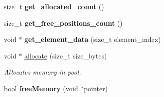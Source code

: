 \begin{DoxyCompactItemize}
\item 
\hypertarget{classbt_generic_memory_pool_a6e483e9117e17c8df23ba42a12283ea6}{size\+\_\+t {\bfseries get\+\_\+allocated\+\_\+count} ()}\label{classbt_generic_memory_pool_a6e483e9117e17c8df23ba42a12283ea6}

\item 
\hypertarget{classbt_generic_memory_pool_a969d29bf5f9b52a8d9d34ed9f529e3f9}{size\+\_\+t {\bfseries get\+\_\+free\+\_\+positions\+\_\+count} ()}\label{classbt_generic_memory_pool_a969d29bf5f9b52a8d9d34ed9f529e3f9}

\item 
\hypertarget{classbt_generic_memory_pool_aab43c7fd24932f6a1e8b593672df6008}{void $\ast$ {\bfseries get\+\_\+element\+\_\+data} (size\+\_\+t element\+\_\+index)}\label{classbt_generic_memory_pool_aab43c7fd24932f6a1e8b593672df6008}

\item 
void $\ast$ \hyperlink{classbt_generic_memory_pool_acd47d75d6fbd7dbf6f0d7849e0bd9ec1}{allocate} (size\+\_\+t size\+\_\+bytes)
\begin{DoxyCompactList}\small\item\em Allocates memory in pool. \end{DoxyCompactList}\item 
\hypertarget{classbt_generic_memory_pool_a5102aa7ec9a967db95ea1cb12fcb1e12}{bool {\bfseries free\+Memory} (void $\ast$pointer)}\label{classbt_generic_memory_pool_a5102aa7ec9a967db95ea1cb12fcb1e12}

\end{DoxyCompactItemize}
